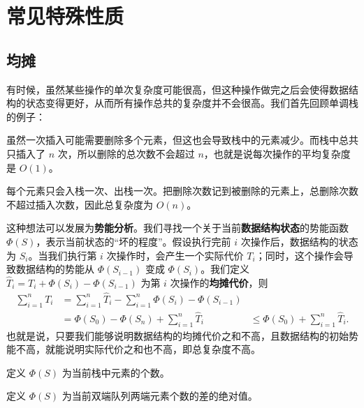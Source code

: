 \chapter{常见特殊性质}

\section{均摊}

有时候，虽然某些操作的单次复杂度可能很高，但这种操作做完之后会使得数据结构的状态变得更好，从而所有操作总共的复杂度并不会很高。我们首先回顾单调栈的例子：
\begin{example}[单调栈]
    虽然一次插入可能需要删除多个元素，但这也会导致栈中的元素减少。而栈中总共只插入了 $n$ 次，所以删除的总次数不会超过 $n$，也就是说每次操作的平均复杂度是 $O(1)$。
\end{example}
\begin{solution}
    每个元素只会入栈一次、出栈一次。把删除次数记到被删除的元素上，总删除次数不超过插入次数，因此总复杂度为 $O(n)$。
\end{solution}

这种想法可以发展为\textbf{势能分析}。我们寻找一个关于当前\textbf{数据结构状态}的势能函数 $\Phi(S)$，表示当前状态的“坏的程度”。假设执行完前 $i$ 次操作后，数据结构的状态为 $S_i$。当我们执行第 $i$ 次操作时，会产生一个实际代价 $T_i$；同时，这个操作会导致数据结构的势能从 $\Phi(S_{i-1})$ 变成 $\Phi(S_i)$。我们定义 $\hat T_i = T_i + \Phi(S_i) - \Phi(S_{i-1})$ 为第 $i$ 次操作的\textbf{均摊代价}，则
$$
\begin{aligned}
\sum_{i=1}^n T_i &= \sum_{i=1}^n \hat T_i-\sum_{i=1}^n \Phi(S_i)-\Phi(S_{i-1})\\
&=\Phi(S_0)-\Phi(S_n)+\sum_{i=1}^n \hat T_i
&\le \Phi(S_0)+\sum_{i=1}^n \hat T_i.
\end{aligned}
$$
也就是说，只要我们能够说明数据结构的均摊代价之和不高，且数据结构的初始势能不高，就能说明实际代价之和也不高，即总复杂度不高。

\begin{exercise}[单调栈]
    定义 $\Phi(S)$ 为当前栈中元素的个数。
\end{exercise}

\begin{exercise}[双端队列]
    定义 $\Phi(S)$ 为当前双端队列两端元素个数的差的绝对值。
\end{exercise}

